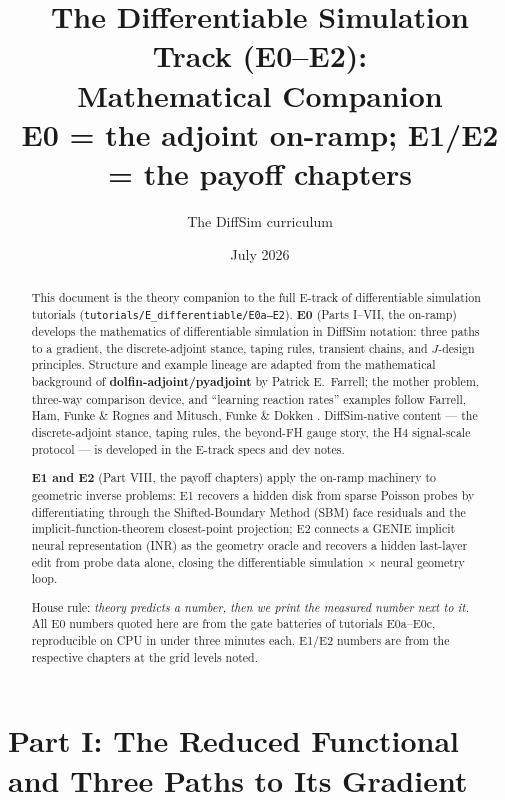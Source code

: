 \documentclass[11pt]{article}
\title{The Differentiable Simulation Track (E0--E2):\\
  Mathematical Companion\\
  \large E0 = the adjoint on-ramp; E1/E2 = the payoff chapters}
\author{The DiffSim curriculum}
\date{July 2026}
\begin{document}
\maketitle

\begin{abstract}
This document is the theory companion to the full E-track of differentiable
simulation tutorials (\texttt{tutorials/E\_differentiable/E0a--E2}).
\textbf{E0} (Parts I--VII, the on-ramp) develops the mathematics of
differentiable simulation in DiffSim notation: three paths to a gradient,
the discrete-adjoint stance, taping rules, transient chains, and $J$-design
principles.  Structure and example lineage are adapted from the mathematical
background of \textbf{dolfin-adjoint/pyadjoint} by Patrick E.~Farrell; the
mother problem, three-way comparison device, and ``learning reaction rates''
examples follow Farrell, Ham, Funke \& Rognes \cite{farrell2013} and
Mitusch, Funke \& Dokken \cite{mitusch2019}.  DiffSim-native content ---
the discrete-adjoint stance, taping rules, the beyond-FH gauge story, the
H4 signal-scale protocol --- is developed in the E-track specs and dev
notes.

\textbf{E1 and E2} (Part VIII, the payoff chapters) apply the on-ramp
machinery to geometric inverse problems: E1 recovers a hidden disk from
sparse Poisson probes by differentiating through the Shifted-Boundary
Method (SBM) face residuals and the implicit-function-theorem
closest-point projection; E2 connects a GENIE implicit neural
representation (INR) as the geometry oracle and recovers a hidden
last-layer edit from probe data alone, closing the differentiable
simulation $\times$ neural geometry loop.

House rule: \emph{theory predicts a number, then we print the measured
number next to it.}  All E0 numbers quoted here are from the gate batteries
of tutorials E0a--E0c, reproducible on CPU in under three minutes each.
E1/E2 numbers are from the respective chapters at the grid levels noted.
\end{abstract}

\tableofcontents

\section*{Part I: The Reduced Functional and Three Paths to Its Gradient}
\end{document}
